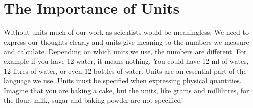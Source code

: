 \documentclass[10pt,a4paper,titlepage,twoside,openright]{report}
\begin{document}
\pagebreak[4]
\section{The Importance of Units}
Without units much of our work as scientists would be meaningless. We need to express our thoughts clearly and units give meaning to the numbers we measure and calculate. Depending on which units we use, the numbers are different. For example if you have 12 water, it means nothing. You could have 12 ml of water, 12 litres of water, or even 12 bottles of water. Units are an essential part of the language we use. Units must be specified when expressing physical quantities. Imagine that you are baking a cake, but the units, like grams and millilitres, for the flour, milk, sugar and baking powder are not specified!

\end{document}
